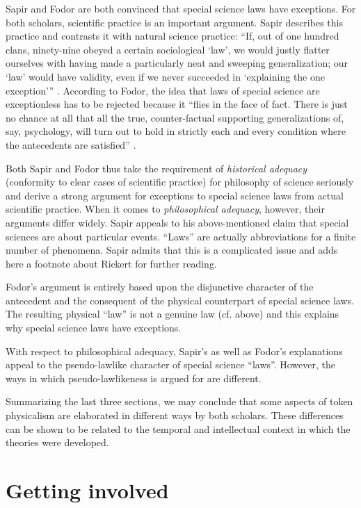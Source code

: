\documentclass[output=paper]{langscibook}
\begin{document}
Sapir and Fodor are both convinced that special science laws have exceptions. For both scholars, scientific practice is an important argument. Sapir describes this practice and contrasts it with natural science practice: ``If, out of one  hundred clans, ninety-nine obeyed a certain sociological `law', we would justly flatter ourselves with having made a particularly neat and sweeping generalization; our `law' would have validity, even if we never succeeded in `explaining the one exception''' \citep[447]{Sapir1917}. According to Fodor, the idea that laws of special science are exceptionless has to be rejected because it ``flies in the face of fact. There is just no chance at all that all the true, counter-factual supporting generalizations of, say, psychology, will turn out to hold in strictly each and every condition where the antecedents are satisfied'' \citep[111]{Fodor1974}.

Both Sapir and Fodor thus take the requirement of \emph{historical adequacy} (conformity to clear cases of scientific practice) for philosophy of science seriously and derive a strong argument for exceptions to special science laws from actual scientific practice. When it comes to \emph{philosophical adequacy}, however, their arguments differ widely. Sapir appeals to his above-mentioned claim that special sciences are about particular events. ``Laws'' are actually abbreviations for a finite number of phenomena. Sapir admits that this is a complicated issue and adds here a footnote about Rickert for further reading.

Fodor's argument is entirely based upon the disjunctive character of the antecedent and the consequent of the physical counterpart of special science laws. The resulting physical ``law'' is not a genuine law (cf.  above) and this explains why special science laws have exceptions.

With respect to philosophical adequacy, Sapir's as well as Fodor's explanations appeal to the pseudo-lawlike character of special science ``laws''. However, the ways in which pseudo-lawlikeness is argued for are different.

Summarizing the last three sections, we may conclude that some aspects of token physicalism are elaborated in different ways by both scholars. These differences can be shown to be related to the temporal and intellectual context in which the theories were developed.

\section{Getting involved}
\label{sec:elffers:gettinginvolved}
\end{document}
